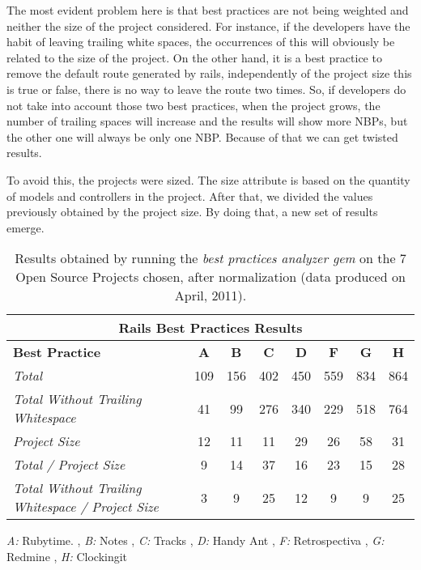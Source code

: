 The most evident problem here is that best practices are not being weighted and neither the size of the project considered.
For instance, if the developers have the habit of leaving trailing white spaces, 
the occurrences of this will obviously be related to the size of the project.
On the other hand, it is a best practice to remove the default route generated by rails, 
independently of the project size this is true or false, there is no way to leave the route two times. 
So, if developers do not take into account those two best practices, when the project grows, 
the number of trailing spaces will increase and the results will show more NBPs, 
but the other one will always be only one NBP.  
Because of that we can get twisted results.

To avoid this, the projects were sized.
The size attribute is based on the quantity of models and controllers in the project.
After that, we divided the values previously obtained  by the project size.
By doing that, a new set of results emerge.

\begin{table}[H]
\begin{center}
{\scriptsize
\begin{threeparttable}
\begin{tabular}{|l||c|c|c|c|c|c|c|} \hline
\multicolumn{8}{|c|}{Rails Best Practices Results} \\ \hline
\textbf{Best Practice}& \textbf{A}& \textbf{B}& \textbf{C}&  \textbf{D}& \textbf{F}& \textbf{G}& \textbf{H} \\\hline\hline
\emph{Total                                           }              & 109  & 156  & 402  & 450 & 559 & 834 & 864  \\ \hline
\emph{Total Without Trailing Whitespace               }              &  41  &  99  & 276  & 340 & 229 & 518 & 764  \\ \hline
\emph{Project Size                                    }              &  12  &  11  &  11  &  29 &  26 &  58 &  31  \\ \hline
\emph{Total / Project Size                            }              &   9  &  14  &  37  &  16 &  23 &  15 &  28  \\ \hline
\emph{Total Without Trailing Whitespace / Project Size}              &   3  &   9  &  25  &  12 &   9 &   9 &  25  \\ \hline
\end{tabular}
\begin{tablenotes}
  \item \emph{A:} Rubytime.
  , \emph{B:} Notes
  , \emph{C:} Tracks
  , \emph{D:} Handy Ant
  , \emph{F:} Retrospectiva
  , \emph{G:} Redmine
  , \emph{H:} Clockingit
\end{tablenotes}
\end{threeparttable}
}
\end{center}
\caption{Results obtained by running the \emph{best practices analyzer gem} on the 7 Open Source Projects chosen, after normalization (data produced on April, 2011).}
\label{table:OSPHWebSites}
\end{table}

